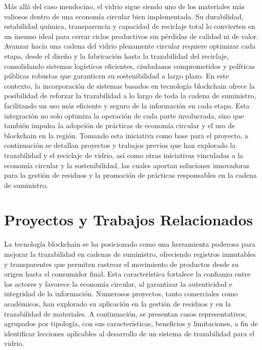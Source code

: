 Más allá del caso mendocino, el vidrio sigue siendo uno de los materiales más valiosos dentro de una economía circular bien implementada. Su durabilidad, estabilidad química, transparencia y capacidad de reciclaje total lo convierten en un insumo ideal para cerrar ciclos productivos sin pérdidas de calidad ni de valor. Avanzar hacia una cadena del vidrio plenamente circular requiere optimizar cada etapa, desde el diseño y la fabricación hasta la trazabilidad del reciclaje, consolidando sistemas logísticos eficientes, ciudadanos comprometidos y políticas públicas robustas que garanticen su sostenibilidad a largo plazo. En este contexto, la incorporación de sistemas basados en tecnología blockchain ofrece la posibilidad de reforzar la trazabilidad a lo largo de toda la cadena de suministro, facilitando un uso más eficiente y seguro de la información en cada etapa. Esta integración no solo optimiza la operación de cada parte involucrada, sino que también impulsa la adopción de prácticas de economía circular y el uso de blockchain en la región. Tomando esta iniciativa como base para el proyecto, a continuación se detallan proyectos y trabajos previos que han explorado la trazabilidad y el reciclaje de vidrio, así como otras iniciativas vinculadas a la economía circular y la sostenibilidad, las cuales aportan soluciones innovadoras para la gestión de residuos y la promoción de prácticas responsables en la cadena de suministro.

\section{Proyectos y Trabajos Relacionados}
\label{sec:related-work}

La tecnología blockchain se ha posicionado como una herramienta poderosa para mejorar la trazabilidad en cadenas de suministro, ofreciendo registros inmutables y transparentes que permiten rastrear el movimiento de productos desde su origen hasta el consumidor final. Esta característica fortalece la confianza entre los actores y favorece la economía circular, al garantizar la autenticidad e integridad de la información. Numerosos proyectos, tanto comerciales como académicos, han explorado su aplicación en la gestión de residuos y en la trazabilidad de materiales. A continuación, se presentan casos representativos, agrupados por tipología, con sus características, beneficios y limitaciones, a fin de identificar lecciones aplicables al desarrollo de un sistema de trazabilidad para el vidrio.

